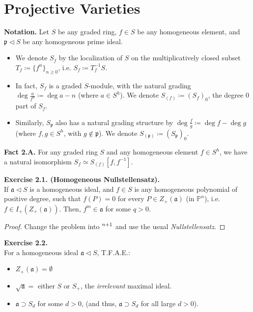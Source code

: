 \documentclass[11pt,a4paper,footinclude=true,headinclude=true]{scrbook} %
\let\AA\relax
\DeclareMathOperator{\AA}{\mathbb{A}}
\newcommand{\PP}{\mathbb{P}}
\newcommand{\pp}{\mathfrak{p}}
\newcommand{\<}{\langle}
\newcommand{\>}{\rangle}
\newenvironment{fact}[2][Fact]
    { \begin{mdframed}[backgroundcolor=gray!20] \textbf{#1 #2.} }
    {  \end{mdframed}}
\newenvironment{exe}[2][Exercise]
    { \begin{mdframed}[backgroundcolor=gray!20] \textbf{#1 #2.}\\ }
    {  \end{mdframed}}
\newenvironment{notation}[2][Notation]
    { \begin{mdframed}[backgroundcolor=gray!20] \textbf{#1.} }
    {  \end{mdframed}}
\begin{document}
\chapter{Projective Varieties}
\begin{notation}{(Localizations of Graded Rings)}
    Let $S$ be any graded ring, $f\in S$ be any homogeneous element, and $\pp\triangleleft S$ be any homogeneous prime ideal.
    \begin{itemize}
        \item We denote $S_f$ by the localization of $S$ on the multiplicatively closed subset $T_f\coloneqq\{f^n\}_{n\geq0}$, i.e. $S_f\coloneqq T_f^{-1}S$.
        \item In fact, $S_f$ is a graded $S$-module, with the natural grading $\deg\frac{a}{f^n}\coloneqq\deg a-n$ (where $a\in S^h$). We denote $S_{(f)}\coloneqq(S_f)_0$, the degree $0$ part of $S_f$.
        \item Similarly, $S_\pp$ also has a natural grading structure by $\deg\frac{f}{g}\coloneqq\deg f-\deg g$ (where $f,g\in S^h$, with $g\notin\pp$). We denote $S_{(\pp)}\coloneqq(S_\pp)_0$.
    \end{itemize}
\end{notation}

\begin{fact}{2.A}
    For any graded ring $S$ and any homogeneous element $f\in S^h$, we have a natural isomorphism $S_f\simeq S_{(f)}[f,f^{-1}]$.
\end{fact}

\begin{exe}{2.1. (Homogeneous Nullstellensatz)}
    If $\mathfrak{a}\triangleleft S$ is a homogeneous ideal, and $f\in S$ is any homogeneous polynomial of positive degree, such that $f(P)=0$ for every $P\in Z_+(\mathfrak{a})$ (in $\PP^n$), i.e. $f\in I_+(Z_+(\mathfrak{a}))$. Then, $f^m\in\mathfrak{a}$ for some $q>0$.
\end{exe}
\begin{proof}
    Change the problem into $\AA^{n+1}$ and use the usual \textit{Nullstellensatz}.
\end{proof}

\begin{exe}{2.2}
    For a homogeneous ideal $\mathfrak{a}\triangleleft S$, T.F.A.E.:
    \begin{itemize}
        \item[(i)] $Z_+(\mathfrak{a})=\emptyset$
        \item[(ii)] $\sqrt{\mathfrak{a}}=$ either $S$ or $S_+$, the \textit{irrelevant} maximal ideal.
        \item[(iii)] $\mathfrak{a}\supset S_d$ for some $d>0$, (and thus,  $\mathfrak{a}\supset S_d$ for all large $d>0$). 
    \end{itemize}
\end{exe}
\end{document}
